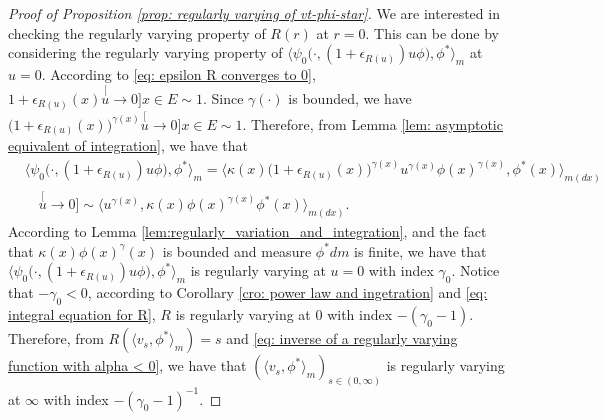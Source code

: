 \documentclass[12pt, a4paper]{amsart}
\theoremstyle{definition}
\numberwithin{equation}{section}
\begin{document}
\begin{proof}[Proof of Proposition \ref{prop: regularly varying of vt-phi-star}]
	We are interested in checking the regularly varying property of $R(r)$ at 
	$r=0$.
	This can be done by considering the regularly varying property of $\big\langle \psi_0 \big(\cdot ,( 1 + \epsilon_{R(u)} ) u \phi \big), \phi^* \big\rangle_m$ at 
	$u = 0$.
    According to \eqref{eq: epsilon R converges to 0},  $1+ \epsilon_{R(u)}(x) \stackrel[u\to 0]{x\in E}{\sim} 1$. 
    Since $\gamma(\cdot)$ is bounded, we have $\big(1+ \epsilon_{R(u)}(x)\big)^{\gamma(x)}\stackrel[u\to 0]{x\in E}{\sim} 1$.
	Therefore, from Lemma \ref{lem: asymptotic equivalent of integration}, we have that
\[\label{eq: regularly part in the integration}\begin{split}
	&\big\langle \psi_0 \big(\cdot,( 1 + \epsilon_{R(u)} ) u \phi \big), \phi^* \big\rangle_m
	= \big\langle \kappa (x)\big( 1 + \epsilon_{R(u)}(x)\big )^{\gamma(x)} u^{\gamma(x)} \phi(x)^{\gamma(x)} , \phi^*(x) \big\rangle_{m(dx)}
	\\ &\quad \stackrel[u\to 0]{}{\sim}  \langle u^{\gamma(x)} , \kappa (x)\phi(x)^{\gamma(x)} \phi^*(x) \rangle_{m(dx)}.
\end{split}\]
	According to Lemma \ref{lem:regularly_variation_and_integration}, and the fact that $\kappa(x)\phi(x)^\gamma(x)$ is bounded and measure $\phi^* dm$ is finite, we have that $\langle \psi_0\big(\cdot,(1+\epsilon_{R(u)})u\phi \big), \phi^* \rangle_m$ is regularly varying at $u = 0$ with index $\gamma_0$.
	Notice that $-\gamma_0 < 0$, according to Corollary \ref{cro: power law and ingetration} and \eqref{eq: integral equation for R}, $R$ is regularly varying at $0$ with index $-(\gamma_0 - 1)$.
	Therefore, from $R(\langle v_s, \phi^*\rangle_m) = s$ and \eqref{eq: inverse of a regularly varying function with alpha < 0}, we have that $(\langle v_s, \phi^*\rangle_m)_{s\in (0,\infty)}$ is regularly varying at $\infty$ with index $-(\gamma_0 - 1)^{-1}$.
	

\end{proof}
\end{document}
